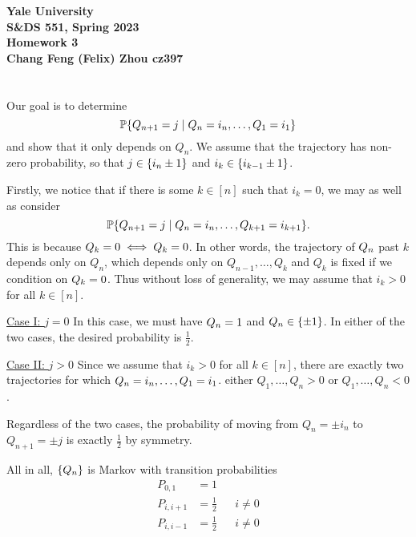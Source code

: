 \documentclass[10pt]{article}
\DeclarePairedDelimiter{\set}{\lbrace}{\rbrace}
\let\abs\relax
\DeclarePairedDelimiter{\abs}{\lvert}{\rvert}
\renewcommand{\P}{\mathbb{P}}
\begin{document}
\begin{center}
    {\Large\textbf{Yale University}}\\
    \vspace{3mm}
    {\Large\textbf{S\&DS 551, Spring 2023}}\\
    \vspace{2mm}
    {\Large\textbf{Homework 3}}\\
    \vspace{3mm}
    \textbf{Chang Feng (Felix) Zhou cz397}
\end{center}

\section{}
\subsection{}
Our goal is to determine
\[
  \P\set{\abs{Q_{n+1}} = j\mid \abs{Q_n}=i_n, \dots, \abs{Q_1}=i_1}
\]
and show that it only depends on $Q_n$.
We assume that the trajectory has non-zero probability,
so that $j\in \set{i_n\pm 1}$ and $i_k\in \set{i_{k-1}\pm 1}$.

Firstly,
we notice that if there is some $k\in [n]$ such that $i_k = 0$,
we may as well as consider
\[
  \P\set{\abs{Q_{n+1}} = j\mid \abs{Q_n}=i_n, \dots, \abs{Q_{k+1}}=i_{k+1}}.
\]
This is because $\abs{Q_k} = 0 \iff Q_k = 0$.
In other words,
the trajectory of $\abs{Q_n}$ past $k$ depends only on $Q_n$,
which depends only on $Q_{n-1}, \dots, Q_k$
and $Q_k$ is fixed if we condition on $\abs{Q_k} = 0$.
Thus without loss of generality,
we may assume that $i_k > 0$ for all $k\in [n]$.

\underline{Case I: $j = 0$}
In this case,
we must have $\abs{Q_n} = 1$
and $Q_n\in \set{\pm 1}$.
In either of the two cases,
the desired probability is $\frac12$.

\underline{Case II: $j > 0$}
Since we assume that $i_k > 0$ for all $k \in [n]$,
there are exactly two trajectories for which $\abs{Q_n} = i_n, \dots, \abs{Q_1} = i_1$.
either $Q_1, \dots, Q_n > 0$ or $Q_1, \dots, Q_n < 0$.

Regardless of the two cases,
the probability of moving from $Q_n = \pm i_n$ to $Q_{n+1} = \pm j$
is exactly $\frac12$ by symmetry.

All in all,
$\set{\abs{Q_n}}$ is Markov with transition probabilities
\begin{align*}
  P_{0,1} &= 1 \\
  P_{i,i+1} &= \frac12 &&i\neq 0 \\
  P_{i, i-1} &= \frac12 &&i\neq 0
\end{align*}
\end{document}
